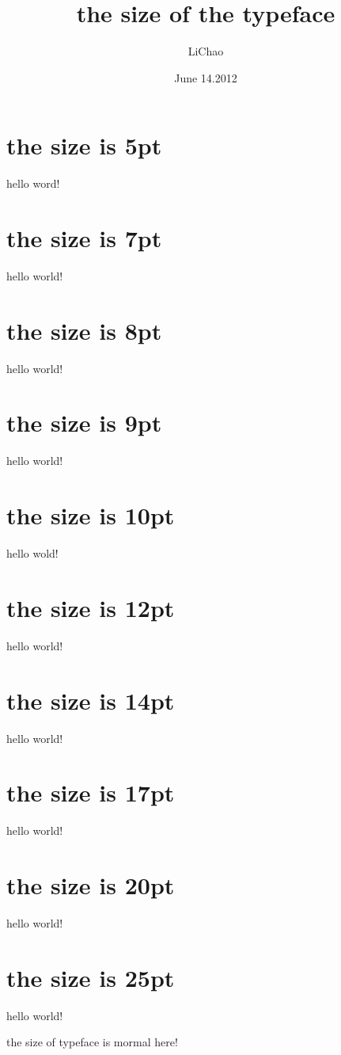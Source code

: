 \documentclass[UTF8]{ctexart}
\title{the size of the typeface}
\author{LiChao}
\date{June 14.2012}
\begin{document}
\maketitle
\part  {the size is 5pt}
\tiny
hello word!

\part  {the size is 7pt}
\scriptsize
hello world!

\part  {the size is 8pt}
\footnotesize
hello world!

\part  {the size is 9pt}
\small
hello world!

\part  {the size is 10pt}
\normalsize
hello wold!

\part  {the size is 12pt}
\large
hello world!

\part  {the size is 14pt}
\Large
hello world!

\part  {the size is 17pt}
\LARGE
hello world!

\part  {the size is 20pt}
\huge
hello world!

\part  {the size is 25pt}
\Huge
hello world!

\normalsize

the size of typeface is mormal here!
\end{document}
